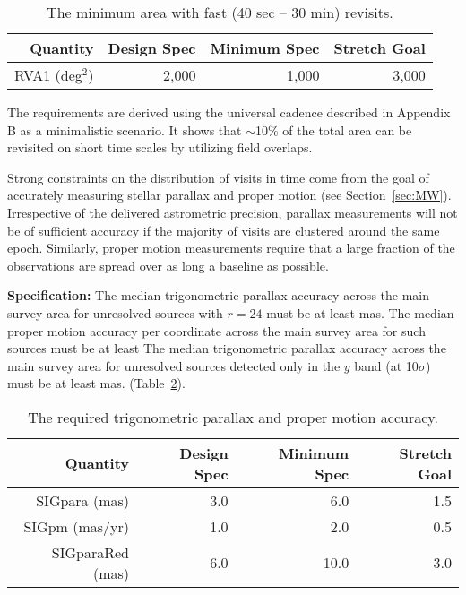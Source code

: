 \begin{table}[h]
\begin{tabular}{|r|r|r|r|}
\hline
Quantity            & Design Spec & Minimum Spec & Stretch Goal     \\
\hline
  RVA1  (deg$^2$)   &  2,000      &  1,000       &     3,000        \\
\hline
\end{tabular}
\caption{The minimum area with fast (40 sec -- 30 min) revisits.}
\label{TfastArea}
\end{table}

The requirements are derived using the universal cadence described in
Appendix B as a minimalistic scenario. It shows that $\sim$10\% of the
total area can be revisited on short time scales by utilizing field
overlaps.

Strong constraints on the distribution of visits in time come from the goal
of accurately measuring stellar parallax and proper motion (see Section~\ref{sec:MW}).
Irrespective of the delivered astrometric precision, parallax measurements will
not be of sufficient accuracy if the majority of visits are clustered around
the same epoch. Similarly, proper motion measurements require that a large
fraction of the observations are spread over as long a baseline as possible.

\G{
{\bf Specification:} The median trigonometric parallax accuracy across the main
survey area for unresolved sources with $r=24$ must be at least
 mas.
The median proper motion accuracy per coordinate across the main
survey area for such sources must be at least
The median trigonometric parallax accuracy across the main survey area for unresolved
sources detected only in the $y$ band (at 10$\sigma$) must be at least
 mas.
(Table~\ref{TablePARAPM}).
}
\begin{table}[h]
\begin{tabular}{|r|r|r|r|}
\hline
Quantity                & Design Spec & Minimum Spec & Stretch Goal       \\
\hline
  SIGpara (mas)             &    3.0     &     6.0          &    1.5         \\
  SIGpm   (mas/yr)        &    1.0     &     2.0          &    0.5         \\
  SIGparaRed (mas)        &   6.0     &    10.0          &    3.0         \\
\hline
\end{tabular}
\caption{The required trigonometric parallax and proper motion accuracy.}
\label{TablePARAPM}
\end{table}

